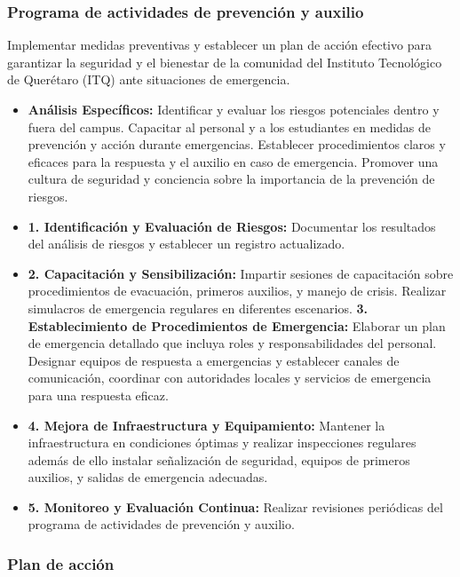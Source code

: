     \subsubsection{Programa de actividades de prevención y auxilio}
    Implementar medidas preventivas y establecer un plan de acción efectivo para garantizar la seguridad y el bienestar de la comunidad del Instituto Tecnológico de Querétaro (ITQ) ante situaciones de emergencia.
    \begin{itemize}
    \item \textbf{ Análisis Específicos:}
    Identificar y evaluar los riesgos potenciales dentro y fuera del campus.
    Capacitar al personal y a los estudiantes en medidas de prevención y acción durante emergencias.
    Establecer procedimientos claros y eficaces para la respuesta y el auxilio en caso de emergencia.
    Promover una cultura de seguridad y conciencia sobre la importancia de la prevención de riesgos.
    
    \item \textbf{1. Identificación y Evaluación de Riesgos:} 
    Documentar los resultados del análisis de riesgos y establecer un registro actualizado.
    \item \textbf{2. Capacitación y Sensibilización:}
    Impartir sesiones de capacitación sobre procedimientos de evacuación, primeros auxilios, y manejo de crisis.
    Realizar simulacros de emergencia regulares en diferentes escenarios.
    \textbf{3. Establecimiento de Procedimientos de Emergencia:}
    Elaborar un plan de emergencia detallado que incluya roles y responsabilidades del personal.
    Designar equipos de respuesta a emergencias y establecer canales de comunicación, coordinar con autoridades locales y servicios de emergencia para una respuesta eficaz.
    \item \textbf{4. Mejora de Infraestructura y Equipamiento:}
    Mantener la infraestructura en condiciones óptimas y realizar inspecciones regulares además de ello instalar señalización de seguridad, equipos de primeros auxilios, y salidas de emergencia adecuadas.
    \item \textbf{5. Monitoreo y Evaluación Continua:}
    Realizar revisiones periódicas del programa de actividades de prevención y auxilio.
    \end{itemize}
    \subsubsection{Plan de acción}
    
